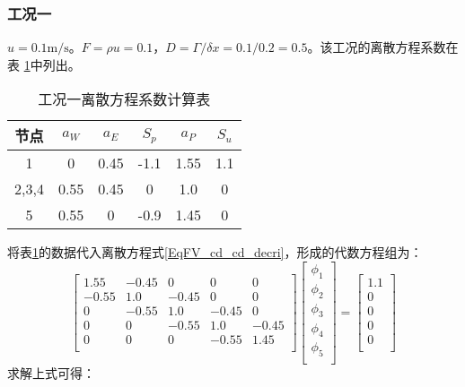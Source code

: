 \subsubsection{工况一}
$u=0.1\mathrm{m/s}$。$F=\rho u=0.1$，$D=\Gamma/\delta x=0.1/0.2=0.5$。该工况的离散方程系数在表
\ref{TbFV_cd_cd_coeff_value}中列出。
\begin{table}[H]
  \begin{center}
  \caption{工况一离散方程系数计算表}
  \label{TbFV_cd_cd_coeff_value}
  \begin{tabular}{|c|c|c|c|c|c|}
    \hline
    节点 & $a_{W}$ & $a_{E}$ & $S_{p}$ & $a_{P}$ & $S_{u}$ \\
    \hline
    1 & 0 & 0.45 & -1.1 &   1.55   & 1.1 \\
    \hline
    2,3,4 & 0.55 & 0.45 & 0 & 1.0 & 0 \\
    \hline
    5 & 0.55 & 0 & -0.9 & 1.45 &  0 \\
    \hline
  \end{tabular}
  \end{center}
\end{table}
将表\ref{TbFV_cd_cd_coeff_value}的数据代入离散方程式\eqref{EqFV_cd_cd_decri}，形成的代数方程组为：
\begin{equation}
  \begin{bmatrix}
    1.55 & -0.45 & 0 & 0 & 0 \\
    -0.55 & 1.0 & -0.45 & 0 & 0 \\
    0 & -0.55 & 1.0 & -0.45 & 0 \\
    0 & 0 & -0.55 & 1.0 & -0.45 \\
    0 & 0 & 0 & -0.55 & 1.45 \\
  \end{bmatrix}
  \begin{bmatrix}
    \phi_{1} \\
    \phi_{2} \\
    \phi_{3} \\
    \phi_{4} \\
    \phi_{5} \\
  \end{bmatrix}
  =
  \begin{bmatrix}
    1.1\\
    0 \\
    0 \\
    0 \\
    0 \\
  \end{bmatrix}
\end{equation}
求解上式可得：
